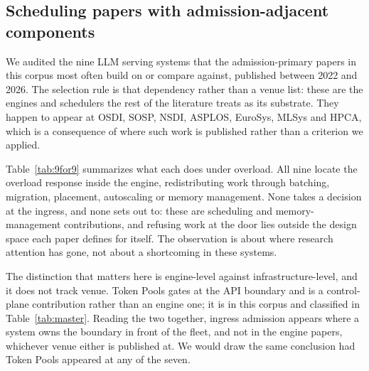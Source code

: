\subsection{Scheduling papers with admission-adjacent components}

We audited the nine LLM serving systems that the admission-primary
papers in this corpus most often build on or compare against, published
between 2022 and 2026. The selection rule is that dependency rather
than a venue list: these are the engines and schedulers the rest of the
literature treats as its substrate. They happen to appear at OSDI,
SOSP, NSDI, ASPLOS, EuroSys, MLSys and HPCA, which is a consequence of
where such work is published rather than a criterion we applied.

Table~\ref{tab:9for9} summarizes what each does under overload. All
nine locate the overload response inside the engine, redistributing
work through batching, migration, placement, autoscaling or memory
management. None takes a decision at the ingress, and none sets out to:
these are scheduling and memory-management contributions, and refusing
work at the door lies outside the design space each paper defines for
itself. The observation is about where research attention has gone, not
about a shortcoming in these systems.

The distinction that matters here is engine-level against
infrastructure-level, and it does not track venue. Token Pools
\citep{cunningham2026tokenpools} gates at the API boundary and is a
control-plane contribution rather than an engine one; it is in this
corpus and classified in Table~\ref{tab:master}. Reading the two
together, ingress admission appears where a system owns the boundary in
front of the fleet, and not in the engine papers, whichever venue
either is published at. We would draw the same conclusion had Token
Pools appeared at any of the seven.

